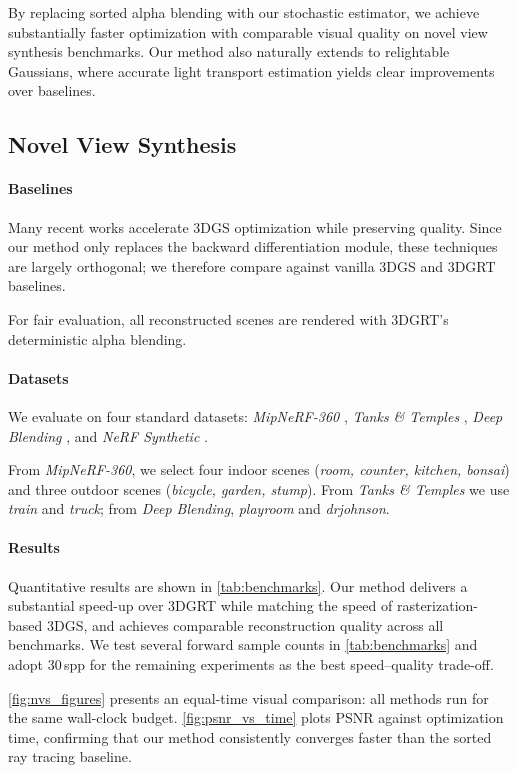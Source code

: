 By replacing sorted alpha blending with our stochastic estimator, we achieve substantially faster optimization with comparable visual quality on novel view synthesis benchmarks. Our method also naturally extends to relightable Gaussians, where accurate light transport estimation yields clear improvements over baselines.


\subsection{Novel View Synthesis}
\paragraph{Baselines}
Many recent works accelerate 3DGS optimization while preserving quality. Since our method only replaces the backward differentiation module, these techniques are largely orthogonal; we therefore compare against vanilla 3DGS and 3DGRT baselines.

For fair evaluation, all reconstructed scenes are rendered with 3DGRT's deterministic alpha blending.

\paragraph{Datasets}
We evaluate on four standard datasets: \textsl{MipNeRF-360} \cite{barron2022mip}, \textsl{Tanks \& Temples} \cite{Knapitsch2017}, \textsl{Deep Blending} \cite{DeepBlending2018}, and \textsl{NeRF Synthetic} \cite{mildenhall2020nerf}.

From \textsl{MipNeRF-360}, we select four indoor scenes (\textsl{room, counter, kitchen, bonsai}) and three outdoor scenes (\textsl{bicycle, garden, stump}).
From \textsl{Tanks \& Temples} we use \textsl{train} and \textsl{truck}; from \textsl{Deep Blending}, \textsl{playroom} and \textsl{drjohnson}.

\paragraph{Results}
Quantitative results are shown in \autoref{tab:benchmarks}. Our method delivers a substantial speed-up over 3DGRT while matching the speed of rasterization-based 3DGS, and achieves comparable reconstruction quality across all benchmarks. We test several forward sample counts in \autoref{tab:benchmarks} and adopt 30\,spp for the remaining experiments as the best speed--quality trade-off.

\autoref{fig:nvs_figures} presents an equal-time visual comparison: all methods run for the same wall-clock budget. \autoref{fig:psnr_vs_time} plots PSNR against optimization time, confirming that our method consistently converges faster than the sorted ray tracing baseline.

